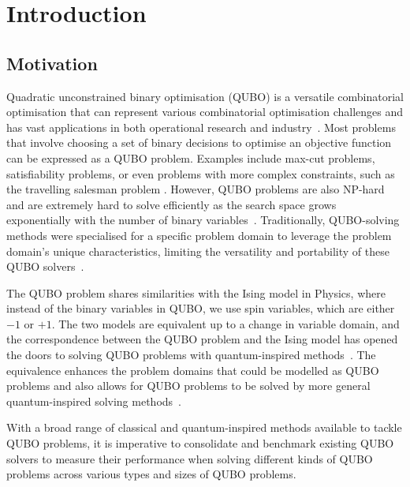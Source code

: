 
\chapter{Introduction}
\vspace{2em}

\section{Motivation}
Quadratic unconstrained binary optimisation (QUBO) is a versatile combinatorial optimisation that can represent various combinatorial optimisation challenges and has vast applications in both operational research and industry~\cite{b1}. Most problems that involve choosing a set of binary decisions to optimise an objective function can be expressed as a QUBO problem. Examples include max-cut problems, satisfiability problems, or even problems with more complex constraints, such as the travelling salesman problem \cite{b10}. However, QUBO problems are also NP-hard and are extremely hard to solve efficiently as the search space grows exponentially with the number of binary variables~\cite{barahona1982computational,b1}. Traditionally, QUBO-solving methods were specialised for a specific problem domain to leverage the problem domain's unique characteristics, limiting the versatility and portability of these QUBO solvers~\cite{b5}.

The QUBO problem shares similarities with the Ising model in Physics, where instead of the binary variables in QUBO, we use spin variables, which are either $-1$ or $+1$. The two models are equivalent up to a change in variable domain, and the correspondence between the QUBO problem and the Ising model has opened the doors to solving QUBO problems with quantum-inspired methods~\cite{b5}. The equivalence enhances the problem domains that could be modelled as QUBO problems and also allows for QUBO problems to be solved by more general quantum-inspired solving methods~\cite{b5}.

With a broad range of classical and quantum-inspired methods available to tackle QUBO problems, it is imperative to consolidate and benchmark existing QUBO solvers to measure their performance when solving different kinds of QUBO problems across various types and sizes of QUBO problems.

